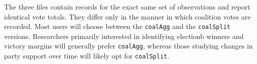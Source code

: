 \documentclass[letter,12pt]{article}
\begin{document}
\noindent The three files contain records for the exact same set of observations and report identical vote totals. They differ only in the manner in which coalition votes are recorded. Most users will choose between the \verb|coalAgg| and the \verb|coalSplit| versions. Researchers primarily interested in identifying electionb winners and victory margins will generally prefer \verb|coalAgg|, whereas those studying changes in party support over time will likely opt for \verb|coalSplit|.

\end{document}
